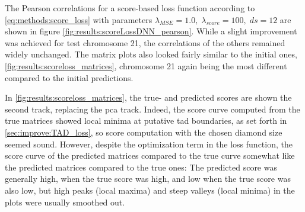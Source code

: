 The Pearson correlations for a score-based loss function according to \cref{eq:methods:score_loss} with  parameters $\lambda_\mathit{MSE}=1.0,\; \lambda_\mathit{score}=100,\; ds=12$ 
are shown in figure \ref{fig:results:scoreLossDNN_pearson}.
While a slight improvement was achieved for test chromosome 21, the correlations of the others remained widely unchanged.
The matrix plots also looked fairly similar to the initial ones, \cref{fig:results:scoreloss_matrices}, chromosome 21 again being the 
most different compared to the initial predictions.

In \cref{fig:results:scoreloss_matrices}, the true- and predicted scores are shown the second track, replacing the \acrshort{pca} track. 
Indeed, the score curve computed from the true matrices showed local minima at putative \acrshort{tad} boundaries, as set forth in \cref{sec:improve:TAD_loss},
so score computation with the chosen diamond size seemed sound.
However, despite the optimization term in the loss function, the score curve of the predicted matrices compared to the true curve 
somewhat like the predicted matrices compared to the true ones:
The predicted score was generally high, when the true score was high, and low when the true score was also low,
but high peaks (local maxima) and steep valleys (local minima) in the plots were usually smoothed out.

